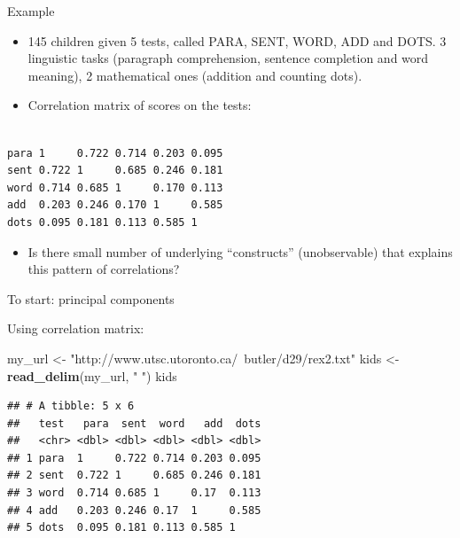\documentclass[ignorenonframetext,]{beamer}
\newenvironment{Shaded}{\begin{snugshade}}{\end{snugshade}}
\newcommand{\DataTypeTok}[1]{\textcolor[rgb]{0.13,0.29,0.53}{#1}}
\newcommand{\KeywordTok}[1]{\textcolor[rgb]{0.13,0.29,0.53}{\textbf{#1}}}
\newcommand{\NormalTok}[1]{#1}
\newcommand{\OperatorTok}[1]{\textcolor[rgb]{0.81,0.36,0.00}{\textbf{#1}}}
\newcommand{\StringTok}[1]{\textcolor[rgb]{0.31,0.60,0.02}{#1}}
\providecommand{\tightlist}{%
  \setlength{\itemsep}{0pt}\setlength{\parskip}{0pt}}
\begin{document}
\begin{frame}[fragile]{Example}
\protect\hypertarget{example-1}{}

\begin{itemize}
\item
  145 children given 5 tests, called PARA, SENT, WORD, ADD and DOTS. 3
  linguistic tasks (paragraph comprehension, sentence completion and
  word meaning), 2 mathematical ones (addition and counting dots).
\item
  Correlation matrix of scores on the tests:
\end{itemize}

\begin{verbatim}

para 1     0.722 0.714 0.203 0.095
sent 0.722 1     0.685 0.246 0.181
word 0.714 0.685 1     0.170 0.113
add  0.203 0.246 0.170 1     0.585
dots 0.095 0.181 0.113 0.585 1
\end{verbatim}

\begin{itemize}
\tightlist
\item
  Is there small number of underlying ``constructs'' (unobservable) that
  explains this pattern of correlations?
\end{itemize}

\end{frame}

\begin{frame}[fragile]{To start: principal components}
\protect\hypertarget{to-start-principal-components}{}

Using correlation matrix:

\begin{Shaded}
\begin{Highlighting}[]
\NormalTok{my_url <-}\StringTok{ "http://www.utsc.utoronto.ca/~butler/d29/rex2.txt"}
\NormalTok{kids <-}\StringTok{ }\KeywordTok{read_delim}\NormalTok{(my_url, }\StringTok{" "}\NormalTok{)}
\NormalTok{kids}
\end{Highlighting}
\end{Shaded}

\begin{verbatim}
## # A tibble: 5 x 6
##   test   para  sent  word   add  dots
##   <chr> <dbl> <dbl> <dbl> <dbl> <dbl>
## 1 para  1     0.722 0.714 0.203 0.095
## 2 sent  0.722 1     0.685 0.246 0.181
## 3 word  0.714 0.685 1     0.17  0.113
## 4 add   0.203 0.246 0.17  1     0.585
## 5 dots  0.095 0.181 0.113 0.585 1
\end{verbatim}

\begin{Shaded}
\end{Shaded}

\end{frame}
\end{document}
